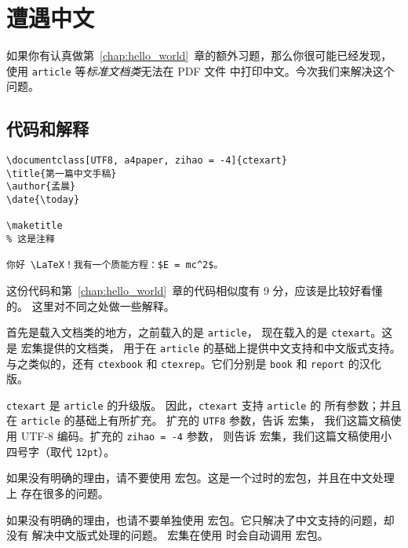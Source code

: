 \chapter{遭遇中文}
\label{chap:chinese}

如果你有认真做第~\ref{chap:hello_world}~章的额外习题，那么你很可能已经发现，
使用 \lstinline[style = iltx]|article| 等\emph{标准文档类}无法在 PDF 文件
中打印中文。今次我们来解决这个问题。

\section{代码和解释}

\begin{lstlisting}[style = lltx, caption = {你好 \LaTeX{}}, label = {lst:chinese}]
\documentclass[UTF8, a4paper, zihao = -4]{ctexart}
\title{第一篇中文手稿}
\author{孟晨}
\date{\today}

\maketitle
% 这是注释

你好 \LaTeX！我有一个质能方程：$E = mc^2$。

\end{lstlisting}

这份代码和第~\ref{chap:hello_world}~章的代码相似度有 9 分，应该是比较好看懂的。
这里对不同之处做一些解释。

首先是载入文档类的地方，之前载入的是 \lstinline[style = iltx]|article|，
现在载入的是 \lstinline[style = iltx]|ctexart|。这是 \ctex{} 宏集提供的文档类，
用于在 \lstinline[style = iltx]|article| 的基础上提供中文支持和中文版式支持。
与之类似的，还有 \lstinline[style = iltx]|ctexbook| 和
\lstinline[style = iltx]|ctexrep|。它们分别是 \lstinline[style = iltx]|book| 和
\lstinline[style = iltx]|report| 的汉化版。

\lstinline[style = iltx]|ctexart| 是 \lstinline[style = iltx]|article| 的升级版。
因此，\lstinline[style = iltx]|ctexart| 支持 \lstinline[style = iltx]|article| 的
所有参数；并且在 \lstinline[style = iltx]|article| 的基础上有所扩充。
扩充的 \lstinline[style = iltx]|UTF8| 参数，告诉 \ctex{} 宏集，
我们这篇文稿使用 UTF-8 编码。扩充的 \lstinline[style = iltx]|zihao = -4| 参数，
则告诉 \ctex{} 宏集，我们这篇文稿使用小四号字（取代 \lstinline[style = iltx]|12pt|）。

\begin{warning}
  如果没有明确的理由，请不要使用  宏包。这是一个过时的宏包，并且在中文处理上
  存在很多的问题。

  如果没有明确的理由，也请不要单独使用  宏包。它只解决了中文支持的问题，却没有
  解决中文版式处理的问题。\ctex{} 宏集在使用 \XeLaTeX 时会自动调用  宏包。
\end{warning}

